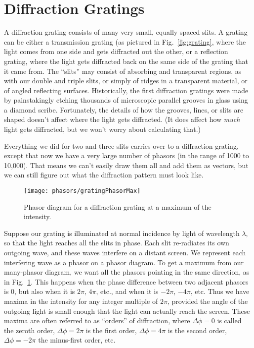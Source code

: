 \section{Diffraction Gratings}

A  diffraction grating  consists of  many very  small,  equally spaced
slits. A grating can be either a transmission grating (as pictured
in Fig.~\ref{fig:grating}, where the light
comes from one side and gets diffracted out the other, or a reflection
grating, where the light gets diffracted  back on the same side of the
grating that it came from.  The ``slits'' may consist of absorbing and
transparent regions, as with our double and triple slits, or simply of
ridges in  a transparent material,  or of angled  reflecting surfaces.
Historically,   the   first   diffraction   gratings  were   made   by
painstakingly  etching thousands  of microscopic  parallel  grooves in
glass using a diamond scribe.  Fortunately, the details of how the
grooves, lines, or slits are shaped doesn't affect where the light gets diffracted. (It does affect how \emph{much} light gets diffracted, but we won't worry about calculating that.) 

Everything  we  did  for  two  and  three  slits  carries  over  to  a
diffraction grating,  except that now we  have a very  large number of
phasors (in the  range of 1000 to 10,000). That  means we can't easily
draw them  all and add  them as vectors,  but we can still  figure out
what the diffraction pattern must look like. 


\begin{figure}
\begin{center}\texttt{[image: phasors/gratingPhasorMax]}
\end{center}
\caption{\label{gratingMaxFig}Phasor diagram for a diffraction grating
at a maximum of the intensity.}
\end{figure}


Suppose our grating is illuminated at normal incidence by light of
wavelength $\lambda$, so that the light reaches all the slits in
phase.  Each slit re-radiates its own outgoing wave, and these waves
interfere on a distant screen. We represent each interfering wave as
a phasor on a phasor diagram.  To get a maximum from our many-phasor
diagram, we want all the phasors pointing in the same direction, as
in Fig.~\ref{gratingMaxFig}.  This happens when the phase difference
between two adjacent phasors is $0$, but also when it is $2\pi$, $4\pi$,
etc., and when it is $-2\pi$, $-4\pi$, etc.  Thus we have maxima in the
intensity for any integer multiple of $2\pi$, provided the angle of the
outgoing light is small enough that the light can actually reach the
screen. These maxima are often referred to as ``orders'' of diffraction,
where $\Delta\phi=0$ is called the zeroth order, $\Delta\phi=2\pi$ is the
first order, $\Delta\phi = 4\pi$ is the second order, $\Delta\phi=-2\pi$
the minus-first order, etc.

